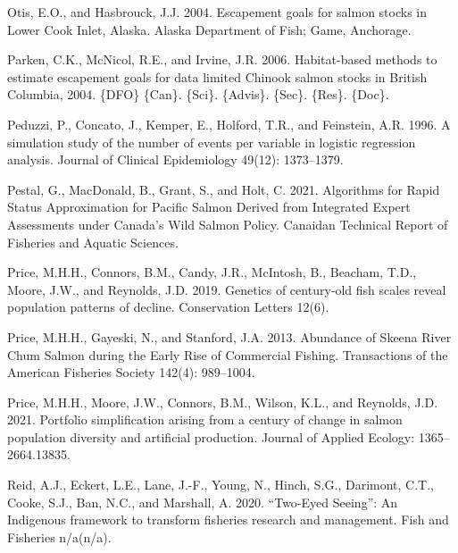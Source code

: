 \documentclass[11pt]{book}
\begin{document}
\begin{CSLReferences}{1}{0}
%
Otis, E.O., and Hasbrouck, J.J. 2004. Escapement goals for salmon stocks in {Lower} {Cook} {Inlet}, {Alaska}. Alaska Department of Fish; Game, Anchorage.

%
Parken, C.K., McNicol, R.E., and Irvine, J.R. 2006. Habitat-based methods to estimate escapement goals for data limited {Chinook} salmon stocks in {British} {Columbia}, 2004. \{DFO\} \{Can\}. \{Sci\}. \{Advis\}. \{Sec\}. \{Res\}. \{Doc\}.

%
Peduzzi, P., Concato, J., Kemper, E., Holford, T.R., and Feinstein, A.R. 1996. A simulation study of the number of events per variable in logistic regression analysis. Journal of Clinical Epidemiology 49(12): 1373--1379.

%
Pestal, G., MacDonald, B., Grant, S., and Holt, C. 2021. Algorithms for {Rapid} {Status} {Approximation} for {Pacific} {Salmon} {Derived} from {Integrated} {Expert} {Assessments} under {Canada}'s {Wild} {Salmon} {Policy}. Canaidan Technical Report of Fisheries and Aquatic Sciences.

%
Price, M.H.H., Connors, B.M., Candy, J.R., McIntosh, B., Beacham, T.D., Moore, J.W., and Reynolds, J.D. 2019. Genetics of century‐old fish scales reveal population patterns of decline. Conservation Letters 12(6).

%
Price, M.H.H., Gayeski, N., and Stanford, J.A. 2013. Abundance of {Skeena} {River} {Chum} {Salmon} during the {Early} {Rise} of {Commercial} {Fishing}. Transactions of the American Fisheries Society 142(4): 989--1004.

%
Price, M.H.H., Moore, J.W., Connors, B.M., Wilson, K.L., and Reynolds, J.D. 2021. Portfolio simplification arising from a century of change in salmon population diversity and artificial production. Journal of Applied Ecology: 1365--2664.13835.

%
Reid, A.J., Eckert, L.E., Lane, J.-F., Young, N., Hinch, S.G., Darimont, C.T., Cooke, S.J., Ban, N.C., and Marshall, A. 2020. {``{Two}-{Eyed} {Seeing}''}: {An} {Indigenous} framework to transform fisheries research and management. Fish and Fisheries n/a(n/a).


\end{CSLReferences}
\end{document}
